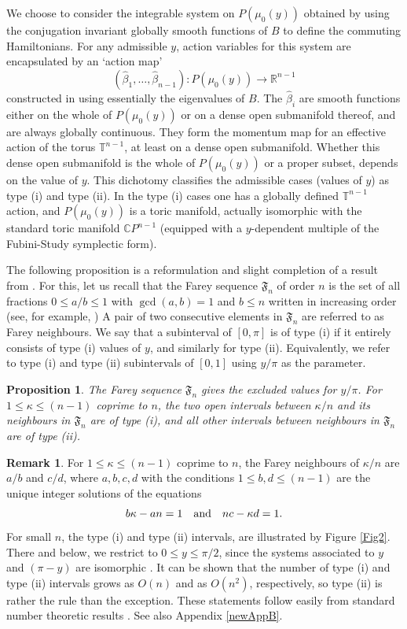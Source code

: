 \documentclass[a4paper,11pt,reqno]{amsart}
\newtheorem{prop}[thm]{Proposition}
\theoremstyle{definition}
\newtheorem{rem}[thm]{Remark}
\numberwithin{equation}{section}
\newcommand{\be}{\begin{equation}}
\newcommand{\ee}{\end{equation}}
\def\bT{{\mathbb T}}                        %
\def\cp{\mathbb{C}P^{n-1}}                  %
\def\bR{{\mathbb R}}                        %
\def\fF{{\mathfrak F}}                      %
\begin{document}
 We choose to consider the integrable system on $P(\mu_0(y))$
obtained by using the conjugation invariant globally smooth functions of $B$
 to define the commuting Hamiltonians.
For any admissible $y$, action variables for this system are encapsulated by an `action map'
\be
(\hat \beta_1, \dots, \hat \beta_{n-1}): P(\mu_0(y)) \to \bR^{n-1}
\label{I.7}\ee
constructed in \cite{FK}  using essentially the eigenvalues of $B$.
The $\hat \beta_i$ are smooth functions either on the whole of $P(\mu_0(y))$ or
on a dense open submanifold thereof, and are always globally continuous.
They form the momentum map for an effective action of the torus $\bT^{n-1}$,
at least on a dense open submanifold. Whether this dense open submanifold
is the whole of $P(\mu_0(y))$ or a proper subset, depends on the value
of $y$. This dichotomy classifies the  admissible  cases  (values of $y$)  as type (i) and type (ii).
In the type (i) cases one has a globally defined $\bT^{n-1}$ action,
and $P(\mu_0(y))$ is a toric manifold, actually isomorphic with the standard toric manifold $\cp$ (equipped with a $y$-dependent
multiple of the Fubini-Study symplectic form).

The following proposition is a reformulation and slight completion
  of a result from \cite{FK}.
  For this, let us recall that the Farey sequence $\fF_n$ of order $n$ is the set of all
 fractions $0 \le a/b \le 1$ with $\gcd(a,b) = 1$ and $b \le n$ written in increasing order (see, for example, \cite{HW,R})
A pair of two consecutive elements in $\fF_n$ are referred to as  Farey neighbours.
We say that a subinterval of $[0,\pi]$ is of type (i) if it entirely consists of type (i) values of $y$,
and similarly for type (ii).
 Equivalently, we  refer to type (i) and type (ii) subintervals of $[0,1]$
using $y/\pi$ as the parameter.


\begin{prop}\label{thmI1}
The Farey sequence $\fF_n$ gives the excluded values for $y/\pi$.
For $1 \leq \kappa  \leq  (n-1)$ coprime to $n$,
the two open intervals between  $\kappa/n$ and its
neighbours in $\fF_n$ are of type (i),
and all other intervals between neighbours in $\fF_n$ are of type (ii).
\end{prop}


 \begin{rem}
For  $1 \leq \kappa \leq (n-1)$ coprime to $n$, the Farey neighbours of $\kappa/n$ are $a/b$ and $c/d$, where
$a,b,c,d$ with the conditions $1 \leq b,d \leq (n-1)$ are the unique integer solutions of the equations
\be
b \kappa - a n = 1
\quad \hbox{and}\quad n c - \kappa d = 1.
\label{HardyI1}\ee
For small $n$, the type (i) and type (ii) intervals,
are illustrated by Figure \ref{Fig2}.
There and below, we restrict to $0 \leq y \leq \pi/2$, since the systems associated to $y$ and $(\pi -y)$ are isomorphic \cite{FK}.
It can be shown  that the number of type (i) and type (ii) intervals grows as $O(n)$ and as $O(n^2)$, respectively,
so  type (ii) is rather the rule than the exception.
These statements follow easily from standard number theoretic results \cite{HW}.
See also Appendix \ref{newAppB}.
 \end{rem}
\end{document}
